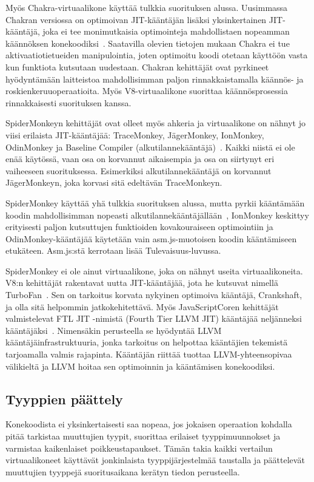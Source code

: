 Myös Chakra-virtuaalikone käyttää tulkkia suorituksen alussa. Uusimmassa Chakran versiossa on optimoivan JIT-kääntäjän lisäksi yksinkertainen JIT-kääntäjä, joka ei tee monimutkaisia optimointeja mahdollistaen nopeamman käännöksen konekoodiksi~\cite{chakra}. Saatavilla olevien tietojen mukaan Chakra ei tue aktivaatiotietueiden manipulointia, joten optimoitu koodi otetaan käyttöön vasta kun funktiota kutsutaan uudestaan. Chakran kehittäjät ovat pyrkineet hyödyntämään laitteistoa mahdollisimman paljon rinnakkaistamalla käännös- ja roskienkeruuoperaatioita. Myös V8-virtuaalikone suorittaa käännösprosessia rinnakkaisesti suorituksen kanssa.

SpiderMonkeyn kehittäjät ovat olleet myös ahkeria ja virtuaalikone on nähnyt jo viisi erilaista JIT-kääntäjää: TraceMonkey, JägerMonkey, IonMonkey, OdinMonkey ja Baseline Compiler (alkutilannekääntäjä)~\cite{monkeys}. Kaikki niistä ei ole enää käytössä, vaan osa on korvannut aikaisempia ja osa on siirtynyt eri vaiheeseen suorituksessa. Esimerkiksi alkutilannekääntäjä on korvannut JägerMonkeyn, joka korvasi sitä edeltävän TraceMonkeyn.

SpiderMonkey käyttää yhä tulkkia suorituksen alussa, mutta pyrkii kääntämään koodin mahdollisimman nopeasti alkutilannekääntäjällään~\cite{baseline}, IonMonkey keskittyy erityisesti paljon kutsuttujen funktioiden kovakouraiseen optimointiin ja OdinMonkey-kääntäjää käytetään vain asm.js-muotoisen koodin kääntämiseen etukäteen. Asm.js:stä kerrotaan lisää Tulevaisuus-luvussa.

SpiderMonkey ei ole ainut virtuaalikone, joka on nähnyt useita virtuaalikoneita. V8:n kehittäjät rakentavat uutta JIT-kääntäjää, jota he kutsuvat nimellä TurboFan~\cite{turbofan}. Sen on tarkoitus korvata nykyinen optimoiva kääntäjä, Crankshaft, ja olla sitä helpommin jatkokehitettävä. Myös JavaScriptCoren kehittäjät valmistelevat FTL JIT -nimistä (Fourth Tier LLVM JIT) kääntäjää neljänneksi kääntäjäksi~\cite{ftljit}. Nimensäkin perusteella se hyödyntää LLVM kääntäjäinfrastruktuuria, jonka tarkoitus on helpottaa kääntäjien tekemistä tarjoamalla valmis rajapinta. Kääntäjän riittää tuottaa LLVM-yhteensopivaa välikieltä ja LLVM hoitaa sen optimoinnin ja kääntämisen konekoodiksi.

\subsection{Tyyppien päättely}

Konekoodista ei yksinkertaisesti saa nopeaa, jos jokaisen operaation kohdalla pitää tarkistaa muuttujien tyypit, suorittaa erilaiset tyyppimuunnokset ja varmistaa kaikenlaiset poikkeustapaukset. Tämän takia kaikki vertailun virtuaalikoneet käyttävät jonkinlaista tyyppijärjestelmää taustalla ja päättelevät muuttujien tyyppejä suoritusaikana kerätyn tiedon perusteella.

